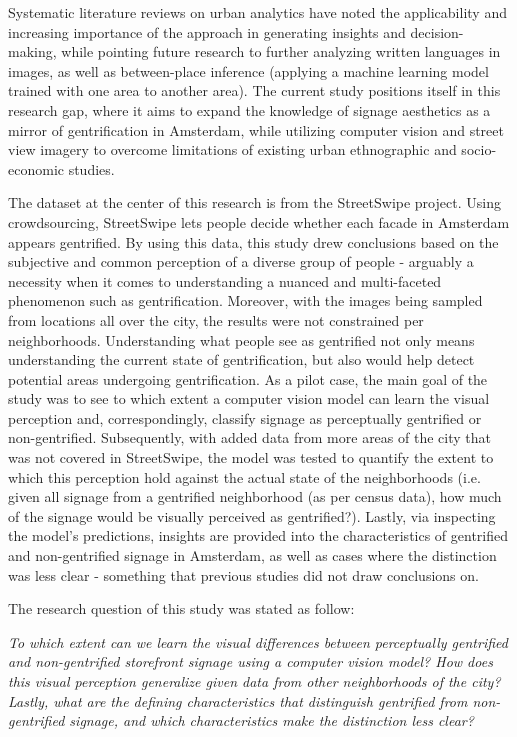 Systematic literature reviews on urban analytics \cite{biljecki_street_2021, zhanga_urban_2023} have noted the applicability and increasing importance of the approach in generating insights and decision-making, while pointing future research to further analyzing written languages in images, as well as between-place inference (applying a machine learning model trained with one area to another area). The current study positions itself in this research gap, where it aims to expand the knowledge of signage aesthetics as a mirror of gentrification in Amsterdam, while utilizing computer vision and street view imagery to overcome limitations of existing urban ethnographic and socio-economic studies.

The dataset at the center of this research is from the StreetSwipe project. Using crowdsourcing, StreetSwipe \cite{streetswipe} lets people decide whether each facade in Amsterdam appears gentrified. By using this data, this study drew conclusions based on the subjective and common perception of a diverse group of people - arguably a necessity when it comes to understanding a nuanced and multi-faceted phenomenon such as gentrification. Moreover, with the images being sampled from locations all over the city, the results were not constrained per neighborhoods. Understanding what people see as gentrified not only means understanding the current state of gentrification, but also would help detect potential areas undergoing gentrification. As a pilot case, the main goal of the study was to see to which extent a computer vision model can learn the visual perception and, correspondingly, classify signage as perceptually gentrified or non-gentrified. Subsequently, with added data from more areas of the city that was not covered in StreetSwipe, the model was tested to quantify the extent to which this perception hold against the actual state of the neighborhoods (i.e. given all signage from a gentrified neighborhood (as per census data), how much of the signage would be visually perceived as gentrified?). Lastly, via inspecting the model's predictions, insights are provided into the characteristics of gentrified and non-gentrified signage in Amsterdam, as well as cases where the distinction was less clear - something that previous studies did not draw conclusions on.

The research question of this study was stated as follow: 

\noindent\textit{To which extent can we learn the visual differences between perceptually gentrified and non-gentrified storefront signage using a computer vision model? How does this visual perception generalize given data from other neighborhoods of the city? Lastly, what are the defining characteristics that distinguish gentrified from non-gentrified signage, and which characteristics make the distinction less clear?}

